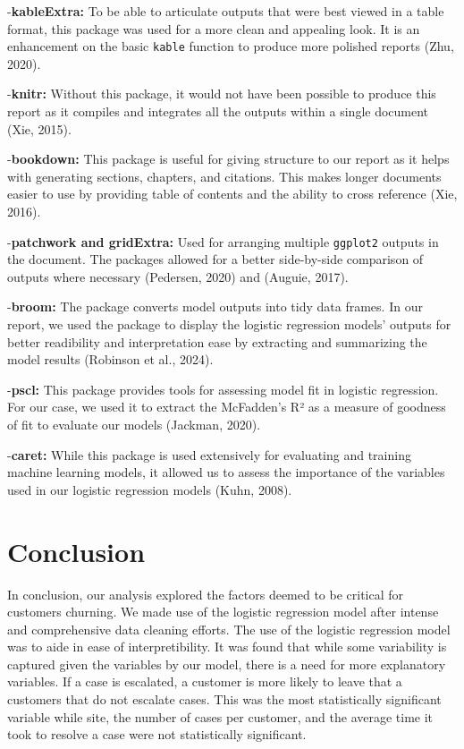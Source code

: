 \documentclass[
]{article}
\begin{document}
-\textbf{kableExtra:} To be able to articulate outputs that were best viewed in a table format, this package was used for a more clean and appealing look. It is an enhancement on the basic \texttt{kable} function to produce more polished reports (Zhu, 2020).

-\textbf{knitr:} Without this package, it would not have been possible to produce this report as it compiles and integrates all the outputs within a single document (Xie, 2015).

-\textbf{bookdown:} This package is useful for giving structure to our report as it helps with generating sections, chapters, and citations. This makes longer documents easier to use by providing table of contents and the ability to cross reference (Xie, 2016).

-\textbf{patchwork and gridExtra:} Used for arranging multiple \texttt{ggplot2} outputs in the document. The packages allowed for a better side-by-side comparison of outputs where necessary (Pedersen, 2020) and (Auguie, 2017).

-\textbf{broom:} The package converts model outputs into tidy data frames. In our report, we used the package to display the logistic regression models' outputs for better readibility and interpretation ease by extracting and summarizing the model results (Robinson et al., 2024).

-\textbf{pscl:} This package provides tools for assessing model fit in logistic regression. For our case, we used it to extract the McFadden's R² as a measure of goodness of fit to evaluate our models (Jackman, 2020).

-\textbf{caret:} While this package is used extensively for evaluating and training machine learning models, it allowed us to assess the importance of the variables used in our logistic regression models (Kuhn, 2008).

\section{Conclusion}\label{conclusion}

In conclusion, our analysis explored the factors deemed to be critical for customers churning. We made use of the logistic regression model after intense and comprehensive data cleaning efforts. The use of the logistic regression model was to aide in ease of interpretibility. It was found that while some variability is captured given the variables by our model, there is a need for more explanatory variables. If a case is escalated, a customer is more likely to leave that a customers that do not escalate cases. This was the most statistically significant variable while site, the number of cases per customer, and the average time it took to resolve a case were not statistically significant.
\end{document}
